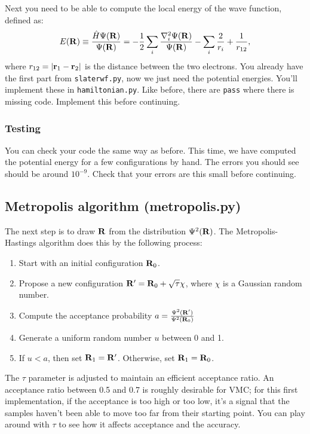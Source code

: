 \documentclass[12pt]{article}
\newcommand{\bR}{{\bf R}}
\newcommand{\br}{{\bf r}}
\begin{document}
Next you need to be able to compute the local energy of the wave function, defined as:
\begin{equation}
E(\bR)
\equiv
\frac{\hat{H}\Psi(\bR)}{\Psi(\bR) } = -\frac{1}{2} \sum_i \frac{\nabla_i^2 \Psi(\bR)}{\Psi(\bR)} - \sum_i \frac{2}{r_i} + \frac{1}{r_{12}},
\end{equation}
where $r_{12}=|\br_1-\br_2|$ is the distance between the two electrons.
You already have the first part from \verb|slaterwf.py|, now we just need the potential energies. 
You'll implement these in \verb|hamiltonian.py|. 
Like before, there are \verb|pass| where there is missing code. 
Implement this before continuing. 

\subsubsection{Testing}

You can check your code the same way as before.
This time, we have computed the potential energy for a few configurations by hand. 
The errors you should see should be around $10^{-9}$.
Check that your errors are this small before continuing.

\subsection{Metropolis algorithm (metropolis.py)}

The next step is to draw $\bR$ from the distribution $\Psi^2(\bR)$. 
The Metropolis-Hastings algorithm does this by the following process:
\begin{enumerate}
\item Start with an initial configuration $\bR_0$. 	
\item Propose a new configuration $\bR'=\bR_0 + \sqrt{\tau} \chi$, where $\chi$ is a Gaussian random number.
\item Compute the acceptance probability $a=\frac{\Psi^2(\bR')}{\Psi^2(\bR_0)}$
\item Generate a uniform random number $u$ between 0 and 1. 
\item If $u < a$, then set $\bR_1=\bR'$. Otherwise, set $\bR_1=\bR_0$.
\end{enumerate}

The $\tau$ parameter is adjusted to maintain an efficient acceptance ratio. 
An acceptance ratio between 0.5 and 0.7 is roughly desirable for VMC; for this first implementation, if the acceptance is too high or too low, it's a signal that the samples haven't been able to move too far from their starting point.
You can play around with $\tau$ to see how it affects acceptance and the accuracy.
\end{document}
